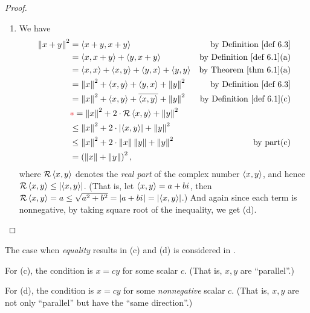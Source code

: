 \begin{proof}
\begin{enumerate}
\item We have
\begin{align*}
    \norm{x + y}^2 & = \LG x + y, x + y \RG & \text{by \DEF{6.3}} \\
        & = \LG x, x + y \RG + \LG y, x + y \RG & \text{by \DEF{6.1}(a)} \\
        & = \LG x, x \RG + \LG x, y \RG + \LG y, x \RG + \LG y, y \RG & \text{by \THM{6.1}(a)} \\
        & = \norm{x}^2 + \LG x, y \RG + \LG y, x \RG + \norm{y}^2 & \text{by \DEF{6.3}} \\
        & = \norm{x}^2 + \LG x, y \RG + \conjugatet{\LG x, y \RG} + \norm{y}^2 & \text{by \DEF{6.1}(c)} \\
        & \RED{*}= \norm{x}^2 + 2 \cdot \mathcal{R}\LG x, y \RG + \norm{y}^2 \\
        & \le \norm{x}^2 + 2 \cdot \left| \LG x, y \RG \right| + \norm{y}^2 \\
        & \le \norm{x}^2 + 2 \cdot \norm{x} \norm{y} + \norm{y}^2 & \text{by part(c)} \\
        & = \left(\norm{x} + \norm{y}\right)^2,
\end{align*}
\RED{*}where \(\mathcal{R}\left< x, y \right>\) denotes the \emph{real part} of the complex number \(\left< x, y \right>\), and hence \(\mathcal{R}\left< x, y \right> \le \left| \left< x, y \right> \right|\).
(That is, let \(\left< x, y \right> = a + b {i\mkern1mu}\), then \(\mathcal{R}\left< x, y \right> = a \le \sqrt{a^2 + b^2} = \lvert a + b{i\mkern1mu}\rvert = \lvert\left< x, y \right>\rvert\).)
And again since each term is nonnegative, by taking square root of the inequality, we get (d).
\end{enumerate}
\end{proof}

\begin{note}
The case when \emph{equality} results in (c) and (d) is considered in .

For (c), the condition is \(x = cy\) for some scalar \(c\).
(That is, \(x, y\) are ``parallel''.)

For (d), the condition is \(x = cy\) for some \emph{nonnegative} scalar \(c\).
(That is, \(x, y\) are not only ``parallel'' but have the ``same direction''.)
\end{note}

